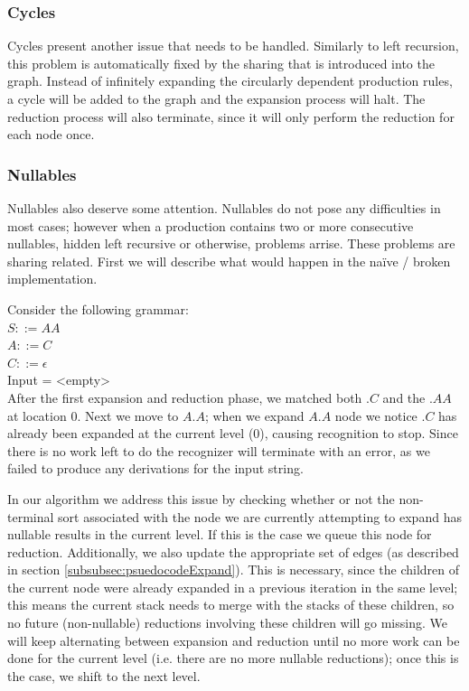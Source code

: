 \documentclass[a4paper,10pt]{article}
\begin{document}
\subsubsection{Cycles}
Cycles present another issue that needs to be handled. Similarly to left recursion, this problem is automatically fixed by the sharing that is introduced into the graph. Instead of infinitely expanding the circularly dependent production rules, a cycle will be added to the graph and the expansion process will halt. The reduction process will also terminate, since it will only perform the reduction for each node once.

\subsubsection{Nullables}
\label{subsec:nullables}
Nullables also deserve some attention. Nullables do not pose any difficulties in most cases; however when a production contains two or more consecutive nullables, hidden left recursive or otherwise, problems arrise. These problems are sharing related. First we will describe what would happen in the naïve / broken implementation.

Consider the following grammar:\\
$S ::= AA$\\
$A ::= C$\\
$C ::= \epsilon$\\
Input = <empty>\\
After the first expansion and reduction phase, we matched both $.C$ and the $.AA$ at location $0$. Next we move to $A.A$; when we expand $A.A$ node we notice $.C$ has already been expanded at the current level ($0$), causing recognition to stop. Since there is no work left to do the recognizer will terminate with an error, as we failed to produce any derivations for the input string.

In our algorithm we address this issue by checking whether or not the non-terminal sort associated with the node we are currently attempting to expand has nullable results in the current level. If this is the case we queue this node for reduction. Additionally, we also update the appropriate set of edges (as described in section \ref{subsubsec:psuedocodeExpand}). This is necessary, since the children of the current node were already expanded in a previous iteration in the same level; this means the current stack needs to merge with the stacks of these children, so no future (non-nullable) reductions involving these children will go missing. We will keep alternating between expansion and reduction until no more work can be done for the current level (i.e. there are no more nullable reductions); once this is the case, we shift to the next level.
\end{document}
